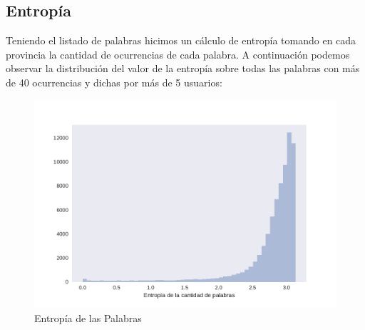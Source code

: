 







\subsection{Entropía}
Teniendo el listado de palabras hicimos un cálculo de entropía tomando en cada provincia la cantidad de ocurrencias de cada palabra. A continuación podemos observar la distribución del valor de la entropía sobre todas las palabras con más de 40 ocurrencias y dichas por más de 5 usuarios:


\begin{figure}[ht]
\centering
\includegraphics[width=1.0\textwidth]{./images/DistribucionEntropia.pdf}
\caption{Entropía de las Palabras} 
\label{fig:entropiaPalabras} 
\end{figure}

